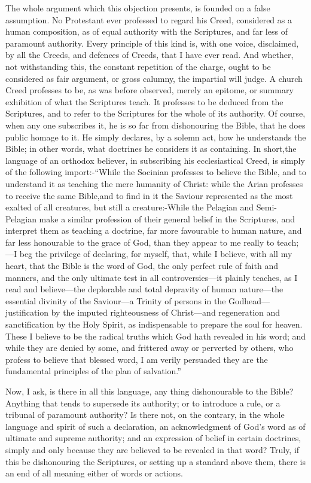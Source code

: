 \documentclass[
]{book}
\begin{document}
The whole argument which this objection presents, is founded on a false assumption. No Protestant ever professed to regard his Creed, considered as a human composition, as of equal authority with the Scriptures, and far less of paramount authority. Every principle of this kind is, with one voice, disclaimed, by all the Creeds, and defences of Creeds, that I have ever read. And whether, not withstanding this, the constant repetition of the charge, ought to be considered as fair argument, or gross calumny, the impartial will judge. A church Creed professes to be, as was before observed, merely an epitome, or summary exhibition of what the Scriptures teach. It professes to be deduced from the Scriptures, and to refer to the Scriptures for the whole of its authority. Of course, when any one subscribes it, he is so far from dishonouring the Bible, that he does public homage to it. He simply declares, by a solemn act, how he understands the Bible; in other words, what doctrines he considers it as containing. In short,the language of an orthodox believer, in subscribing his ecclesiastical Creed, is simply of the following import:-``While the Socinian professes to believe the Bible, and to understand it as teaching the mere humanity of Christ: while the Arian professes to receive the same Bible,and to find in it the Saviour represented as the most exalted of all creatures, but still a creature:-While the Pelagian and Semi-Pelagian make a similar profession of their general belief in the Scriptures, and interpret them as teaching a doctrine, far more favourable to human nature, and far less honourable to the grace of God, than they appear to me really to teach;---I beg the privilege of declaring, for myself, that, while I believe, with all my heart, that the Bible is the word of God, the only perfect rule of faith and manners, and the only ultimate test in all controversies---it plainly teaches, as I read and believe---the deplorable and total depravity of human nature---the essential divinity of the Saviour---a Trinity of persons in the Godhead---justification by the imputed righteousness of Christ---and regeneration and sanctification by the Holy Spirit, as indispensable to prepare the soul for heaven. These I believe to be the radical truths which God hath revealed in his word; and while they are denied by some, and frittered away or perverted by others, who profess to believe that blessed word, I am verily persuaded they are the fundamental principles of the plan of salvation.''

Now, I ask, is there in all this language, any thing dishonourable to the Bible? Anything that tends to supersede its authority; or to introduce a rule, or a tribunal of paramount authority? Is there not, on the contrary, in the whole language and spirit of such a declaration, an acknowledgment of God's word as of ultimate and supreme authority; and an expression of belief in certain doctrines, simply and only because they are believed to be revealed in that word? Truly, if this be dishonouring the Scriptures, or setting up a standard above them, there is an end of all meaning either of words or actions.
\end{document}
